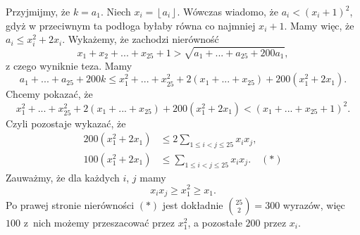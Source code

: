 \noindent
Przyjmijmy, że $k = a_1$.
Niech $x_i = \left\lfloor a_i \right\rfloor$. Wówczas wiadomo, że $a_i < (x_i + 1)^2$, gdyż w przeciwnym ta podłoga byłaby równa co najmniej $x_i + 1$. Mamy więc, że $a_i \leqslant x_i^2 + 2x_i$. Wykażemy, że zachodzi nierówność
\[
	x_1 + x_2 + ... + x_{25} + 1 > \sqrt{a_1 + ... + a_{25} + 200a_1},
\]
z czego wyniknie teza.
Mamy
\[
	a_1 + ... + a_{25} + 200k \leqslant x_1^2 + ... + x_{25}^2 + 2(x_1 + ... + x_{25}) + 200(x_1^2 + 2x_1).
\]
Chcemy pokazać, że
\[
	x_1^2 + ... + x_{25}^2 + 2(x_1 + ... + x_{25}) + 200(x_1^2 + 2x_1) < (x_1 + ... + x_{25} + 1)^2.
\]
Czyli pozostaje wykazać, że
\begin{align*}
	200(x_1^2 + 2x_1)  &\leqslant  2\sum_{1 \leqslant i < j \leqslant 25} x_ix_j, \\
	100(x_1^2 + 2x_1)  &\leqslant  \sum_{1 \leqslant i < j \leqslant 25} x_ix_j. \quad (*)
\end{align*}
Zauważmy, że dla każdych $i$, $j$ mamy
\[
	x_ix_j \geqslant x_1^2 \geqslant x_1.
\]
Po prawej stronie nierówności $(*)$ jest dokładnie ${{25}\choose{2}} = 300$ wyrazów, więc $100$ z~nich możemy przeszacować przez $x_{1}^2$, a pozostałe $200$ przez $x_i$.




